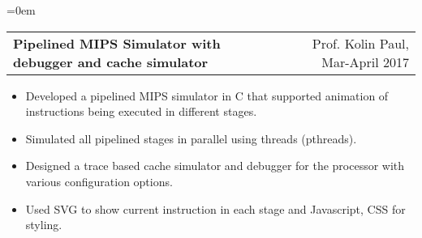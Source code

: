 \documentclass{article}
\makeatletter
\newcommand{\headerrow}[2]
{\begin{tabular*}{\linewidth}{l@{\extracolsep{\fill}}r}
	#1 &
	#2 \\
\end{tabular*}}
\makeatother
\begin{document}
\begin{list} {}{\leftmargin=0em}
    \item[]
    \headerrow {\textbf{Pipelined MIPS Simulator with debugger and cache simulator}}{Prof. Kolin Paul, Mar-April 2017}
    \begin{itemize}
    \setlength\itemsep{0.0em}
        \item Developed a pipelined MIPS simulator in C that supported animation of instructions being executed in different stages.
        \item Simulated all pipelined stages in parallel using threads (pthreads).
        \item Designed a trace based cache simulator and debugger for the processor with various configuration options.
        \item Used SVG to show current instruction in each stage and Javascript, CSS for styling.
    \end{itemize}

\end{list}
\end{document}
